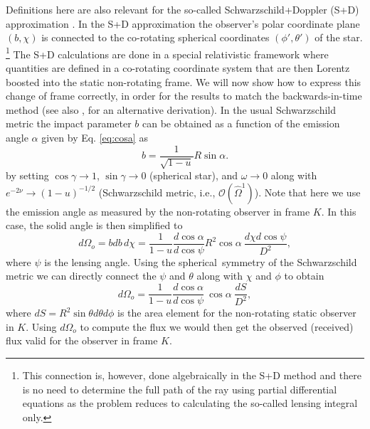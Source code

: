\documentclass{aa}
\newcommand{\be}{\begin{equation}}
\newcommand{\ee}{\end{equation}}
\newcommand{\refe}[1]{#1}
\newcommand{\sch}{Schwarzschild }
\newcommand{\Ob}{\ensuremath{\hat{\Omega}}}
\begin{document}
\refe{Definitions} here are also relevant for the so-called Schwarzschild+Doppler (S+D) approximation \cite[see e.g.,][]{PB06}.
In the S+D approximation the observer's polar coordinate plane $(b,\chi)$ is connected to the co-rotating spherical coordinates $(\phi', \theta')$ of the star.%
\footnote{ \refe{This connection is, however, done algebraically in the S+D method and there is no need to determine the full path of the ray using partial differential equations as the problem reduces to calculating the so-called lensing integral only.}
}
\refe{The S+D} calculations are done in a special relativistic framework \refe{where quantities are defined in a co-rotating coordinate system that are then Lorentz boosted into the static non-rotating frame.}
We will now show how to express this \refe{change of frame correctly, in order for the results to match the backwards-in-time method} (see also \citealt{CML07}, for an alternative derivation).
In \refe{the usual} \sch metric the impact parameter $b$ can be obtained as a function of the emission angle $\alpha$ \refe{given by Eq.} \eqref{eq:cosa} as
\be
b = \frac{1}{\sqrt{1-u}} R \sin\alpha.
\ee
by setting $\cos\gamma \rightarrow 1$, $\sin\gamma \rightarrow 0$ (spherical star), and $\omega \rightarrow 0$ along with $e^{-2\nu} \rightarrow (1-u)^{-1/2}$ (\sch metric, i.e., $\mathcal{O}(\Ob^1)$).
Note that here we use the emission angle as measured by the non-rotating observer in frame $K$.
In this case, the solid angle is then simplified to 
\be
d\Omega_o = bdb \, d\chi = \frac{1}{1-u} \frac{d \cos\alpha}{d \cos\psi} R^2 \cos\alpha ~ \frac{d\chi d\cos\psi}{D^2},
\ee
where $\psi$ is the lensing angle.
Using the \refe{spherical} symmetry of the \sch metric we can directly connect the $\psi$ and $\theta$ along with $\chi$ and $\phi$ to obtain
\be
d\Omega_o = \frac{1}{1-u} \frac{d \cos\alpha}{d \cos\psi} ~\cos\alpha ~ \frac{dS}{D^2},
\ee
where $dS = R^2 \sin\theta d\theta d\phi$ is the area element for the non-rotating static observer in $K$.
Using $d\Omega_o$ to compute the flux we would then get the observed (received) flux valid for the observer in frame $K$.
\end{document}
